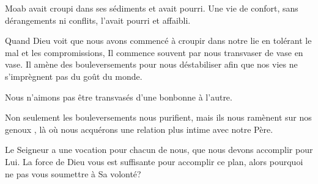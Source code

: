 Moab avait croupi dans ses sédiments et avait pourri.
 Une vie de confort, sans dérangements ni conflits,
 l'avait pourri et affaibli. 

Quand Dieu voit que nous avons commencé à croupir dans notre lie
 en tolérant le mal et les compromissions,
 Il commence souvent par nous transvaser de vase en vase.
 Il amène des bouleversements pour nous déstabiliser afin que nos vies
 ne s'imprègnent pas du goût du monde. 

Nous n'aimons pas être transvasés d'une bonbonne à l'autre. 


Non seulement les bouleversements nous purifient,
 mais ils nous ramènent \Og sur nos genoux \Fg{},
 là où nous acquérons une relation plus intime
 avec notre Père. 

Le Seigneur a une vocation pour chacun de nous,
 que nous devons accomplir pour Lui.
 La force de Dieu vous est suffisante pour accomplir ce plan,
 alors pourquoi ne pas vous soumettre à Sa volonté? 

\dvrule




